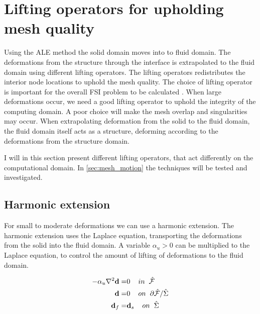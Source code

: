 \section{Lifting operators for upholding mesh quality} \label{sec:meshmotion}
Using the ALE method the solid domain moves into to fluid domain. The deformations from the structure through the interface is extrapolated to the fluid domain using different lifting operators. The lifting operators redistributes the interior node locations to uphold the mesh quality.  
The choice of lifting operator is important for the overall FSI problem to be calculated \cite{Wick2011a}. When large deformations occur, we need a good lifting operator to uphold the integrity of the computing domain. A poor choice will make the mesh overlap and singularities may occur. 
When extrapolating deformation from the solid to the fluid domain, the fluid domain itself acts as a structure, deforming according to the deformations from the structure domain.\newline

I will in this section present different lifting operators, that act differently on the computational domain. In \ref{sec:mesh_motion} the techniques will be tested and investigated.

\subsection{Harmonic extension}
For small to moderate deformations we can use a harmonic extension. The harmonic extension uses the Laplace equation, transporting the deformations from the solid into the fluid domain. A variable $\alpha_u > 0$ can be multiplied to the Laplace equation, to control the amount of lifting of deformations to the fluid domain.

\begin{align}
 - \alpha_u \nabla^2 \bold{d} =& 0\hspace{4mm} in \hspace{2mm} \hat{\mathcal{F}}\\
  \hspace{4mm} \bold{d} =& 0 \hspace{4mm } on \hspace{2mm }  \partial \hat{\mathcal{F}} / \hat{\Sigma} \\
  \bold{d}_f =& \bold{d}_s \hspace{4mm } on \hspace{2mm } \hat{\Sigma} 
\end{align}

